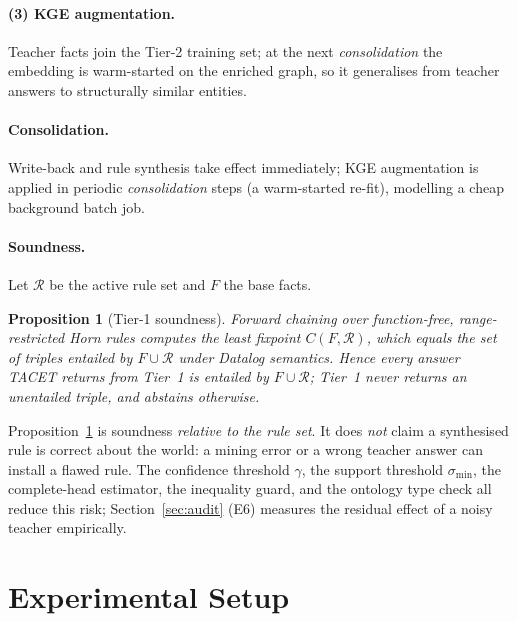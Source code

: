 \documentclass[11pt]{article}
\theoremstyle{plain}
\newtheorem{proposition}{Proposition}
\begin{document}
\paragraph{(3) KGE augmentation.} Teacher facts join the Tier-2 training
set; at the next \emph{consolidation} the embedding is warm-started on the
enriched graph, so it generalises from teacher answers to structurally
similar entities.

\paragraph{Consolidation.} Write-back and rule synthesis take effect
immediately; KGE augmentation is applied in periodic \emph{consolidation}
steps (a warm-started re-fit), modelling a cheap background batch job.

\paragraph{Soundness.} Let $\mathcal{R}$ be the active rule set and $F$ the
base facts.

\begin{proposition}[Tier-1 soundness]
\label{prop:sound}
Forward chaining over function-free, range-restricted Horn rules computes
the least fixpoint $C(F,\mathcal{R})$, which equals the set of triples
entailed by $F\cup\mathcal{R}$ under Datalog semantics. Hence every answer
TACET returns from Tier~1 is entailed by $F\cup\mathcal{R}$; Tier~1 never
returns an unentailed triple, and abstains otherwise.
\end{proposition}

Proposition~\ref{prop:sound} is soundness \emph{relative to the rule set}.
It does \emph{not} claim a synthesised rule is correct about the world: a
mining error or a wrong teacher answer can install a flawed rule. The
confidence threshold $\gamma$, the support threshold $\sigma_{\mathrm{min}}$, the
complete-head estimator, the inequality guard, and the ontology type check
all reduce this risk; Section~\ref{sec:audit} (E6) measures the residual
effect of a noisy teacher empirically.

\section{Experimental Setup}
\label{sec:setup}
\end{document}
